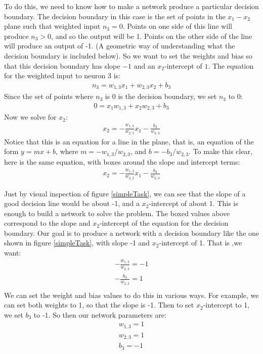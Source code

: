 To do this, we need to know how to make a network produce a particular decision boundary. The decision boundary in this case is the set of points in the $x_1 - x_2$ plane such that weighted input $n_3 = 0$. Points on one side of this line will produce  $n_3 > 0$, and so the output will be 1. Points on the other side of the line will produce an output of -1. (A geometric way of understanding what the decision boundary is included below). So we want to set the weights and bias so that this decision boundary has slope $-1$ and an $x_2$-intercept of $1$. The equation for the weighted input to neuron 3 is:
\begin{eqnarray*}
n_3 =  w_{1,3} x_1 + w_{2,3}  x_2 + b_3
\end{eqnarray*}
Since the set of points where $n_3$ is 0 is the decision boundary, we set $n_3$ to 0:
\begin{eqnarray*}
0 = x_1 w_{1,3} + x_2 w_{2,3} + b_3
\end{eqnarray*}
Now we solve for $x_2$:
\begin{eqnarray*}
x_2 = -\frac{w_{1,3}}{w_{2,3}} x_1  - \frac{b_3}{w_{2,3}}
\end{eqnarray*}
Notice that this is an equation for a line in the plane, that is, an equation of the form $y = mx + b$, where $m = -w_{1,3} / w_{2,3}$, and $b =  -b_3 / w_{2,3}$. To make this clear, here is the same equation, with boxes around the slope and intercept terms:
\begin{eqnarray*}
x_2 =  \boxed{-\frac{w_{1,3}}{ w_{2,3}}} x_1 - \boxed{\frac{b_3}{w_{2,3}}}
\end{eqnarray*}

Just by visual inspection of figure \ref{simpleTask}, we can see that the slope of a good decision line would be about -1, and a $x_2$-intercept of about 1. This is enough to build a network to solve the problem. The boxed values above correspond to the slope and $x_2$-intercept of the equation for the decision boundary. Our goal is to produce a network with a decision boundary like the one shown in figure \ref{simpleTask}, with slope -1 and $x_2$-intercept of 1. That is ,we want:
\begin{eqnarray*}
-\frac{w_{1,3}}{w_{2,3}} = -1 \\
-\frac{b_3 }{w_{2,3}} = 1 \\
\end{eqnarray*}
We can set the weight and bias values to do this in various ways. For example, we can set both weights to 1, so that the slope is -1. Then to set $x_2$-intercept to 1, we set $b_3$ to -1. So then our network parameters are:
\begin{eqnarray*}
w_{1,3}  = 1 \\
w_{2,3}  = 1 \\
b_3  = -1 \\
\end{eqnarray*}

